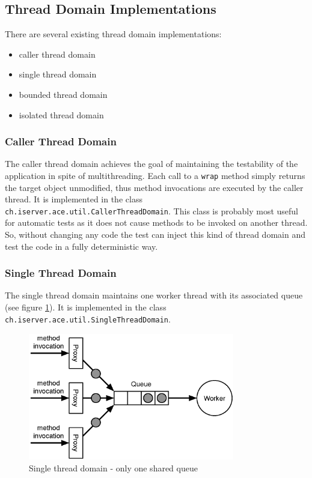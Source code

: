 \subsection{Thread Domain Implementations}
There are several existing thread domain implementations:
\begin{itemize}
 \item caller thread domain
 \item single thread domain
 \item bounded thread domain
 \item isolated thread domain
\end{itemize}

\subsubsection{Caller Thread Domain}
The caller thread domain achieves the goal of maintaining the testability
of the application in spite of multithreading. Each call to a
\texttt{wrap} method simply returns the target object unmodified, thus
method invocations are executed by the caller thread. It
is implemented in the class 
\texttt{ch.\-iserver.\-ace.\-util.\-CallerThreadDomain}.
This class is probably most useful for automatic tests as it does not cause
methods to be invoked on another thread. So, without changing any code
the test can inject this kind of thread domain and test the code
in a fully deterministic way.

\subsubsection{Single Thread Domain}
The single thread domain maintains one worker thread with its associated
queue (see figure \ref{fig:threaddomain.single}). It is implemented in the class
\texttt{ch.\-iserver.\-ace.\-util.\-SingleThreadDomain}.

\begin{figure}[htb]
 \centering
 \includegraphics[width=9cm,height=5.55cm]{../images/finalreport/threaddomain_single.eps}
 \caption{Single thread domain - only one shared queue}
 \label{fig:threaddomain.single}
\end{figure}

